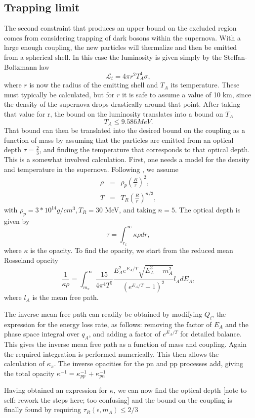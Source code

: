 \documentclass[nofootinbib,aps,prd,preprint,superscriptaddress]{revtex4}
\newcommand{\beq}{\begin{equation}}
\newcommand{\eeq}{\end{equation}}
\newcommand{\bea}{\begin{eqnarray}}
\newcommand{\eea}{\end{eqnarray}}
\begin{document}
\subsection{Trapping limit}
The second constraint that produces an upper bound on the excluded region comes from considering trapping of dark bosons within the supernova. With a large enough coupling, the new particles will thermalize and then be emitted from a spherical shell. In this case the luminosity is given simply by the Steffan-Boltzmann law
\beq
\mathcal{L}_t  = 4\pi r^2 T_A^4 \sigma,
\eeq
where $ r $ is now the radius of the emitting shell and $ T_A $ its temperature. These must typically be calculated, but for $ r $ it is safe to assume a value of 10 km, since the density of the supernova drops drastically around that point. After taking that value for r, the bound on the luminosity translates into a bound on $ T_A $ 
\beq
T_A \le 9.586 MeV.
\eeq
That bound can then be translated into the desired bound on the coupling as a function of mass by assuming that the particles are emitted from an optical depth $ \tau = \frac{2}{3} $, and finding the temperature that corresponds to that optical depth. This is a somewhat involved calculation.
First, one needs a model for the density and temperature in the supernova. Following \cite{dent}, we assume 
\bea
\rho &=& \rho_p (\frac{R}{r})^2,\\
T &=& T_R (\frac{R}{r})^{n/3},
\eea
with $  \rho_p  = 3*10^{14} g/cm^3, T_R = 30$ MeV, and taking $ n = 5 $. The optical depth is given by 
\beq
\tau = \int_{r_x}^{\infty} \kappa \rho dr,
\eeq
where $ \kappa$ is the opacity.  To find the opacity, we start from the reduced mean Rosseland opacity 
\beq
\frac{1}{\kappa \rho} = \int_{m_x}^{\infty} \frac{15}{4 \pi^4 T^5} \frac{E_A^2 e^{E_A/T} \sqrt{E_A^2 - m_A^2}}{(e^{E_A/T}-1)^2} l_A dE_A,
\eeq
where $ l_A $ is the mean free path. 
	
The inverse mean free path can readily be obtained by modifying $ Q_i $, the expression for the energy loss rate, as follows: removing the factor of $ E_A $ and the phase space integral over $ q_A $, and adding a factor of $ e^{E_A/T} $ for detailed balance. This gives the inverse mean free path as a function of mass and coupling. Again the required integration is performed numerically. This then allows the calculation of $ \kappa_x $. The inverse opacities for the pn and pp processes add, giving the total opacity $ \kappa^{-1} = \kappa_{pp}^{-1} + \kappa_{pn}^{-1} $
	
Having obtained an expression for $ \kappa $, we can now find the optical depth
	[note to self: rework the steps here; too confusing]
and the bound on the coupling is finally found by requiring  $ \tau_R(\epsilon,m_A) \le 2/3 $
	
\end{document}
